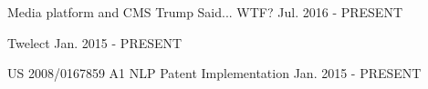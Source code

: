 

\begin{cventries}

  \cventry
    {Media platform and CMS} %
    {Trump Said... WTF?} %
    {} %
    {Jul. 2016 - PRESENT} %
    {
      \begin{cvitems} %
      \end{cvitems}
    }

  \cventry
    {} %
    {Twelect} %
    {} %
    {Jan. 2015 - PRESENT} %
    {
      \begin{cvitems} %
      \end{cvitems}
    }
    
  \cventry
    {US 2008/0167859 A1} %
    {NLP Patent Implementation} %
    {} %
    {Jan. 2015 - PRESENT} %
    {
      \begin{cvitems} %
      \end{cvitems}
    }

\end{cventries}
